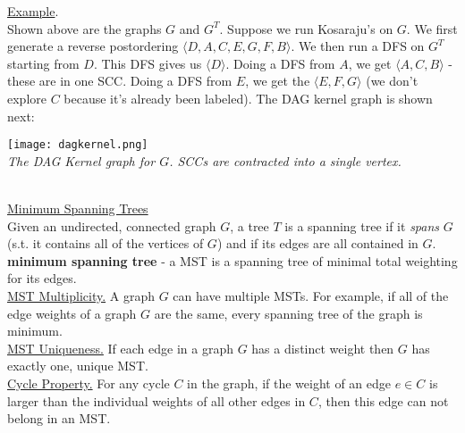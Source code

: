 \documentclass[12pt, fleqn]{general}
\begin{document}
\begin{multicols*}{2}
    \underline{Example}.\\

    Shown above are the graphs $G$ and $G^T$. Suppose we run Kosaraju's on $G$. We first generate a reverse postordering $\langle D, A, C, E, G, F, B \rangle$. We then run a DFS on $G^T$ starting from $D$. This DFS gives us $\langle D \rangle$. Doing a DFS from $A$, we get $\langle A, C, B \rangle$ - these are in one SCC. Doing a DFS from $E$, we get the $\langle E, F, G \rangle$ (we don't explore $C$ because it's already been labeled). The DAG kernel graph is shown next:\\

    \begin{centering}
        \hspace{50pt}\texttt{[image: dagkernel.png]}\\
        \emph{The DAG Kernel graph for $G$. SCCs are contracted into a single vertex.}\\
    \end{centering}\mbox{}\\

    {\large \underline{Minimum Spanning Trees}}\\

    Given an undirected, connected graph $G$, a tree $T$ is a spanning tree if it \emph{spans} $G$ (s.t. it contains all of the vertices of $G$) and if its edges are all contained in $G$.\\

    \textbf{minimum spanning tree} - a MST is a spanning tree of minimal total weighting for its edges.\\
    
    \underline{MST Multiplicity.} A graph $G$ can have multiple MSTs. For example, if all of the edge weights of a graph $G$ are the same, every spanning tree of the graph is minimum.\\

    \underline{MST Uniqueness.} If each edge in a graph $G$ has a distinct weight then $G$ has exactly one, unique MST.\\

    \underline{Cycle Property.} For any cycle $C$ in the graph, if the weight of an edge $e \in C$ is larger than the individual weights of all other edges in $C$, then this edge can not belong in an MST.\\


\end{multicols*}
\end{document}
